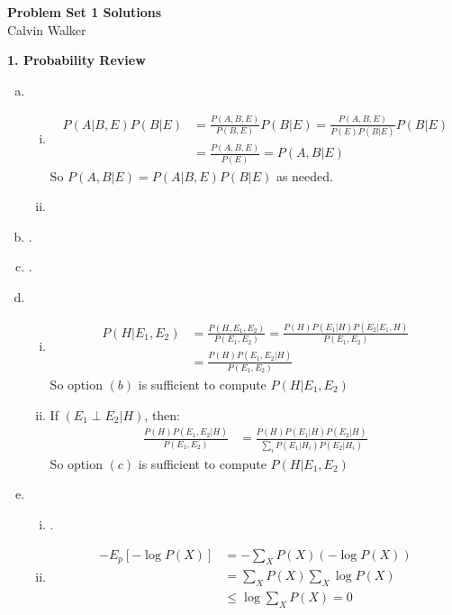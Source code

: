\documentclass{article}
\begin{document}
\begin{center}
    \Large{\textbf{Problem Set 1 Solutions}} \\[0.25ex]
    Calvin Walker
\end{center}
\textbf{1. Probability Review}
\begin{enumerate}[(a)]
    \item \begin{enumerate}[(i)]
        \item \begin{align*}
            P(A|B, E)P(B | E) &= \frac{P(A, B, E)}{P(B, E)}P(B|E) = \frac{P(A, B, E)}{P(E)P(B|E)}P(B|E) \\[0.5ex]
            &= \frac{P(A, B, E)}{P(E)} = P(A, B | E)
        \end{align*}
        So $P(A, B | E) =  P(A|B, E)P(B | E)$ as needed. 
        \item 
    \end{enumerate}
    \item . 
    \item .
    \item \begin{enumerate}[(i)]
        \item \begin{align*}
            P(H|E_1, E_2) &= \frac{P(H, E_1, E_2)}{P(E_1, E_2)} = \frac{P(H)P(E_1|H)P(E_2|E_1, H)}{P(E_1, E_2)} \\
            &= \frac{P(H)P(E_1, E_2 | H)}{P(E_1, E_2)}
        \end{align*}
        So option $(b)$ is sufficient to compute $P(H|E_1, E_2)$
        \item If $(E_1 \perp E_2 | H)$, then: \begin{align*}
            \frac{P(H)P(E_1, E_2 | H)}{P(E_1, E_2)} &= \frac{P(H)P(E_1|H) P(E_2 | H)}{\sum_{i}P(E_1|H_i)P(E_2|H_i)}
        \end{align*}
        So option $(c)$ is sufficient to compute $P(H|E_1, E_2)$
    \end{enumerate}
    \item \begin{enumerate}[(i)]
        \item .
        \item \begin{align*}
            - E_p[- \log P(X)] &= - \sum_{X} P(X) (-\log P(X)) \\
            &= \sum_{X} P(X) \sum_{X} \log P(X) \\
            &\leq \log \sum_{X} P(X) = 0

\end{align*}
\end{enumerate}
\end{enumerate}
\end{document}
